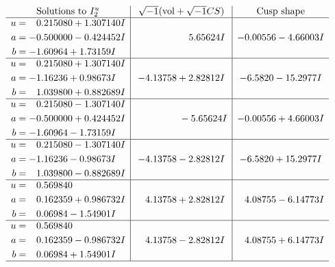 \documentclass[1p]{elsarticle_modified}
\theoremstyle{definition}
\newcommand{\I}{\sqrt{-1}}
\begin{document}
$$\begin{array}{c|c|c}  
\text{Solutions to }I^u_{2}& \I (\text{vol} + \sqrt{-1}CS) & \text{Cusp shape}\\
 \hline 
\begin{aligned}
u &= \phantom{-}0.215080 + 1.307140 I \\
a &= -0.500000 - 0.424452 I \\
b &= -1.60964 + 1.73159 I\end{aligned}
 & \phantom{-0.000000 -}5.65624 I & -0.00556 - 4.66003 I \\ \hline\begin{aligned}
u &= \phantom{-}0.215080 + 1.307140 I \\
a &= -1.16236 + 0.98673 I \\
b &= \phantom{-}1.039800 + 0.882689 I\end{aligned}
 & -4.13758 + 2.82812 I & -6.5820 - 15.2977 I \\ \hline\begin{aligned}
u &= \phantom{-}0.215080 - 1.307140 I \\
a &= -0.500000 + 0.424452 I \\
b &= -1.60964 - 1.73159 I\end{aligned}
 & \phantom{-0.000000 } -5.65624 I & -0.00556 + 4.66003 I \\ \hline\begin{aligned}
u &= \phantom{-}0.215080 - 1.307140 I \\
a &= -1.16236 - 0.98673 I \\
b &= \phantom{-}1.039800 - 0.882689 I\end{aligned}
 & -4.13758 - 2.82812 I & -6.5820 + 15.2977 I \\ \hline\begin{aligned}
u &= \phantom{-}0.569840\phantom{ +0.000000I} \\
a &= \phantom{-}0.162359 + 0.986732 I \\
b &= \phantom{-}0.06984 - 1.54901 I\end{aligned}
 & \phantom{-}4.13758 + 2.82812 I & \phantom{-}4.08755 - 6.14773 I \\ \hline\begin{aligned}
u &= \phantom{-}0.569840\phantom{ +0.000000I} \\
a &= \phantom{-}0.162359 - 0.986732 I \\
b &= \phantom{-}0.06984 + 1.54901 I\end{aligned}
 & \phantom{-}4.13758 - 2.82812 I & \phantom{-}4.08755 + 6.14773 I\\
 \hline 
 \end{array}$$\newpage\newpage\renewcommand{\arraystretch}{1}
\end{document}
